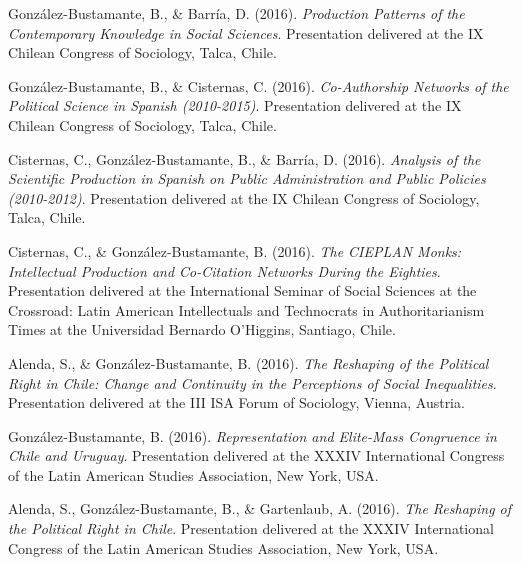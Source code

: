 \begin{publications}
\begin{benumerate}{72}
\item{\small González-Bustamante, B., \& Barría, D. (2016). {\itshape Production Patterns of the Contemporary Knowledge in Social Sciences}. Presentation delivered at the IX Chilean Congress of Sociology, Talca, Chile.}\vspace{1mm}

\item{\small González-Bustamante, B., \& Cisternas, C. (2016). {\itshape Co-Authorship Networks of the Political Science in Spanish (2010-2015)}. Presentation delivered at the IX Chilean Congress of Sociology, Talca, Chile.}\vspace{1mm}

\item{\small Cisternas, C., González-Bustamante, B., \& Barría, D. (2016). {\itshape Analysis of the Scientific Production in Spanish on Public Administration and Public Policies (2010-2012)}. Presentation delivered at the IX Chilean Congress of Sociology, Talca, Chile.}\vspace{1mm}

\item{\small Cisternas, C., \& González-Bustamante, B. (2016). {\itshape The CIEPLAN Monks: Intellectual Production and Co-Citation Networks During the Eighties}. Presentation delivered at the International Seminar of Social Sciences at the Crossroad: Latin American Intellectuals and Technocrats in Authoritarianism Times at the Universidad Bernardo O'Higgins, Santiago, Chile.}\vspace{1mm}

\item{\small Alenda, S., \& González-Bustamante, B. (2016). {\itshape The Reshaping of the Political Right in Chile: Change and Continuity in the Perceptions of Social Inequalities}. Presentation delivered at the III ISA Forum of Sociology, Vienna, Austria.}\vspace{1mm}

\item{\small González-Bustamante, B. (2016). {\itshape Representation and Elite-Mass Congruence in Chile and Uruguay}. Presentation delivered at the XXXIV International Congress of the Latin American Studies Association, New York, USA.}\vspace{1mm}

\item{\small Alenda, S., González-Bustamante, B., \& Gartenlaub, A. (2016). {\itshape The Reshaping of the Political Right in Chile}. Presentation delivered at the XXXIV International Congress of the Latin American Studies Association, New York, USA.}\vspace{1mm}


\end{benumerate}
\end{publications}
